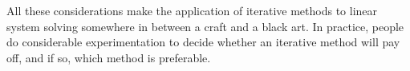 All these considerations make the application of iterative methods to
linear system solving somewhere in between a craft and a black art. In
practice, people do considerable experimentation to decide whether an
iterative method will pay off, and if so, which method is preferable.

